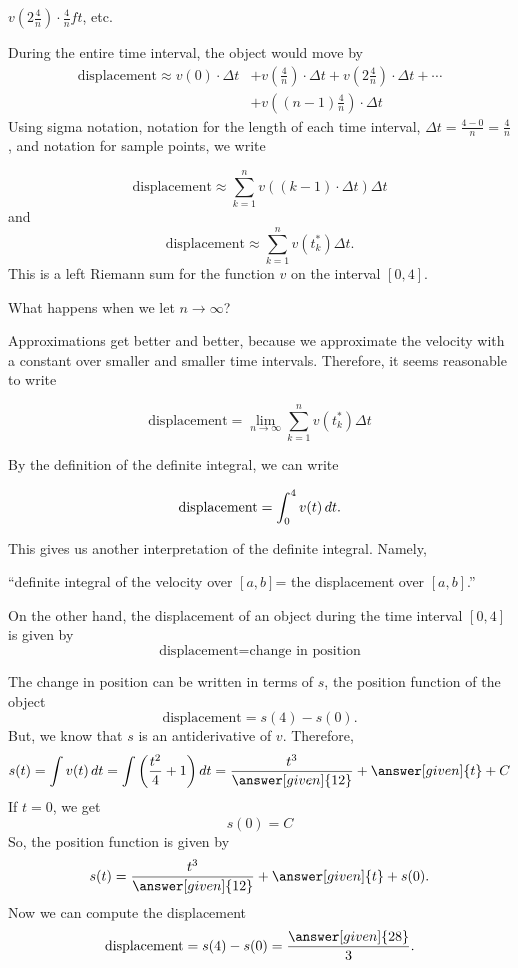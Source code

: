 \documentclass{ximera}
\begin{document}
\begin{example}
\begin{explanation}
 $v\left(2\frac{4}{n}\right)\cdot\frac{4}{n} \unit{ft}$, etc.

 During the entire time interval, the object would move by
\begin{align*}
   \text{displacement} \approx v(0)\cdot\Delta
   t &+v\left(\frac{4}{n}\right)\cdot\Delta
   t+v\left(2\frac{4}{n}\right)\cdot\Delta
   t+\cdots\\
   &+v\left((n-1)\frac{4}{n}\right)\cdot\Delta
   t
\end{align*}
Using sigma notation, notation for the length of each time interval,
$\Delta t=\frac{4-0}{n}=\frac{4}{n}$, and notation for sample points,
we write

  \[
   \text{displacement}\approx \sum_{k=1}^nv((k-1)\cdot\Delta t)\Delta t
\]
and
\[
   \text{displacement}\approx \sum_{k=1}^nv(t_{k}^*)\Delta t.
  \]
  This is a left Riemann sum for the function $v$ on the interval $[0,4]$.


What happens when we let $n\to\infty$?

Approximations get better and better, because we approximate the
velocity with a constant over smaller and smaller time intervals.
Therefore, it seems reasonable to write

  \[
   \text{displacement}=\lim_{n\to\infty}\sum_{k=1}^nv(t_k^*)\Delta t
\]

By  the definition of the definite integral, we can write


  \[
   \text{displacement}=\int_{0}^{4}v(t)\mathop{}\!d t.
\]

This gives us another interpretation of the definite integral. Namely,



``definite integral of the velocity over $[a,b]$= the displacement over $[a,b]$.''



  On the other hand, the displacement of an object during the time interval $[0,4]$ is given by
  \[
   \text{displacement}=\text{change in position}
\]

  The change in position can be written in terms of $s$, the position function of the object
  \[
   \text{displacement}=s(4)-s(0).
\]
But, we know that $s$ is an antiderivative of $v$. Therefore,
 \[
  s(t)=\int v(t)\d t=\int\left(\frac{t^2}{4}+1\right)\d t=\frac{t^3}{\answer[given]{12}}+\answer[given]{t}+C
\]
If $t=0$, we get
 \[
  s(0)=C
\]
So, the position function is given by
\[
  s(t)=\frac{t^3}{\answer[given]{12}}+\answer[given]{t}+s(0).
\]
Now we can compute the displacement
 \[
   \text{displacement}=s(4)-s(0)=\frac{\answer[given]{28}}{3}.
\]
  \end{explanation}


\end{example}
\end{document}
